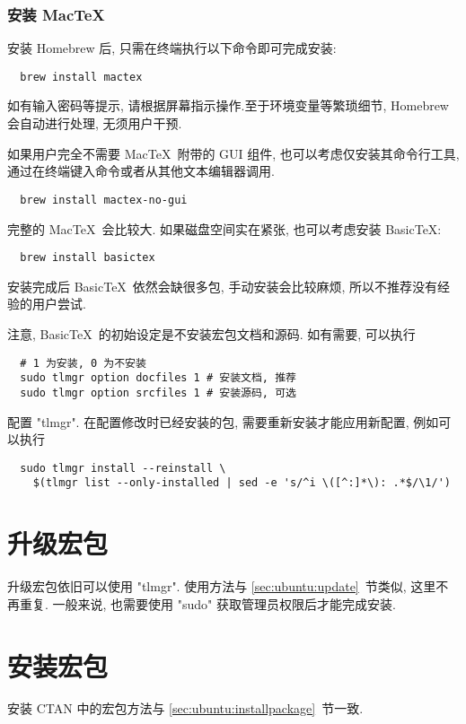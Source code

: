 \subsubsection{安装 Mac\TeX}

安装 Homebrew 后,
只需在\textsf{终端}执行以下命令即可完成安装:
\begin{lstlisting}
  brew install mactex
\end{lstlisting}
如有输入密码等提示, 请根据屏幕指示操作.至于环境变量等繁琐细节, Homebrew 会自动进行处理,
无须用户干预.

如果用户完全不需要 Mac\TeX\ 附带的 GUI 组件, 也可以考虑仅安装其命令行工具, 通过在终端键入命令或者从其他文本编辑器调用.
\begin{lstlisting}
  brew install mactex-no-gui
\end{lstlisting}

完整的 Mac\TeX\ 会比较大. 如果磁盘空间实在紧张, 也可以考虑安装 Basic\TeX:
\begin{lstlisting}
  brew install basictex
\end{lstlisting}
安装完成后 Basic\TeX\ 依然会缺很多包, 手动安装会比较麻烦, 所以不推荐没有经验的用户尝试.

注意, Basic\TeX\ 的初始设定是不安装宏包文档和源码. 如有需要, 可以执行
\begin{lstlisting}
  # 1 为安装, 0 为不安装
  sudo tlmgr option docfiles 1 # 安装文档, 推荐
  sudo tlmgr option srcfiles 1 # 安装源码, 可选
\end{lstlisting}
配置 "tlmgr". 在配置修改时已经安装的包, 需要重新安装才能应用新配置, 例如可以执行
\begin{lstlisting}
  sudo tlmgr install --reinstall \
    $(tlmgr list --only-installed | sed -e 's/^i \([^:]*\): .*$/\1/')
\end{lstlisting}

\section{升级宏包}

升级宏包依旧可以使用 "tlmgr".
使用方法与 \ref{sec:ubuntu:update}~节类似, 这里不再重复.
一般来说, 也需要使用 "sudo" 获取管理员权限后才能完成安装.

\section{安装宏包}

安装 CTAN 中的宏包方法与 \ref{sec:ubuntu:installpackage}~节一致.

